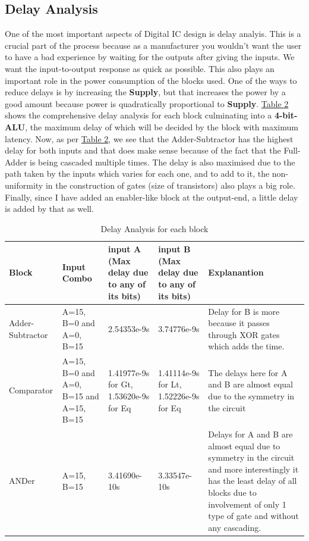 \documentclass[a4paper, titlepage]{article}
\begin{document}
\subsection{Delay Analysis}
One of the most important aspects of Digital IC design is delay analyis. This is a crucial part of the process because 
as a manufacturer you wouldn't want the user to have a bad experience by waiting for the outputs after giving the inputs.
We want the input-to-output response as quick as possible. This also plays an important role in the power consumption of 
the blocks used. \newline 
One of the ways to reduce delays is by increasing the \textbf{Supply}, but that increases the power by a good amount because 
power is quadratically proportional to \textbf{Supply}. \hyperlink{del_tab}{Table 2} shows the comprehensive delay analysis
for each block culminating into a \textbf{4-bit-ALU}, the maximum delay of which will be decided by the block with maximum 
latency. \newline 
Now, as per \hyperlink{del_tab}{Table 2}, we see that the Adder-Subtractor has the highest delay for both inputs and that does make
sense because of the fact that the Full-Adder is being cascaded multiple times. The delay is also maximised due to the path taken by
the inputs which varies for each one, and to add to it, the non-uniformity in the construction of gates (size of transistors)
also plays a big role. Finally, since I have added an enabler-like block at the output-end, a little delay is added by that as
well.
\begin{table}[htp!]
\begin{center} 
\hypertarget{del_tab}{
\begin{tabular}{|p{1.8cm}|p{1.8cm}|p{1.5cm}|p{1.5cm}|p{3cm}|}
    \hline 
    \textbf{Block} & \textbf{Input Combo} & \textbf{input A} (Max delay due to any of its bits) & \textbf{input B} (Max delay due to any of its bits) & \textbf{Explanantion} \\
    \hline
    Adder-Subtractor & A=15, B=0 and A=0, B=15 & 2.54353e-9s & 3.74776e-9s & Delay for B is more because it passes through 
    XOR gates which adds the time.\\
    \hline 
    Comparator & A=15, B=0 and A=0, B=15 and A=15, B=15 & 1.41977e-9s for Gt, 1.53620e-9s for Eq &  1.41114e-9s for Lt, 
    1.52226e-9s for Eq & The delays here for A and B are almost equal due to the symmetry in the circuit\\
    \hline 
    ANDer & A=15, B=15 & 3.41690e-10s & 3.33547e-10s & Delays for A and B are almost equal due to symmetry in the circuit and 
    more interestingly it has the least delay of all blocks due to involvement of only 1 type of gate and without any cascading. \\
    \hline
\end{tabular}}
\caption{Delay Analysis for each block}
\label{tab:t2}
\end{center}
\end{table} \newline
\end{document}
